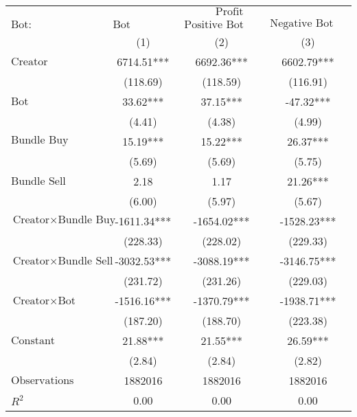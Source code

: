 \begin{tabular}{lccc}
\hline
 & \multicolumn{3}{c}{$\text{Profit}$} \\
 $\text{Bot}:$ & $\text{Bot Comment}$ & $\text{Positive Bot Comment}$ & $\text{Negative Bot Comment}$ \\
 & (1) & (2) & (3)\\
\hline
$\text{Creator}$ & 6714.51*** & 6692.36*** & 6602.79*** \\
 & (118.69) & (118.59) & (116.91) \\
$\text{Bot}$ & 33.62*** & 37.15*** & -47.32*** \\
 & (4.41) & (4.38) & (4.99) \\
$\text{Bundle Buy}$ & 15.19*** & 15.22*** & 26.37*** \\
 & (5.69) & (5.69) & (5.75) \\
$\text{Bundle Sell}$ & 2.18 & 1.17 & 21.26*** \\
 & (6.00) & (5.97) & (5.67) \\
$\text{Creator} \times \text{Bundle Buy}$ & -1611.34*** & -1654.02*** & -1528.23*** \\
 & (228.33) & (228.02) & (229.33) \\
$\text{Creator} \times \text{Bundle Sell}$ & -3032.53*** & -3088.19*** & -3146.75*** \\
 & (231.72) & (231.26) & (229.03) \\
$\text{Creator} \times \text{Bot}$ & -1516.16*** & -1370.79*** & -1938.71*** \\
 & (187.20) & (188.70) & (223.38) \\
$\text{Constant}$ & 21.88*** & 21.55*** & 26.59*** \\
 & (2.84) & (2.84) & (2.82) \\
$\text{Observations}$ & 1882016 & 1882016 & 1882016 \\
$R^2$ & 0.00 & 0.00 & 0.00 \\
\hline
\end{tabular}